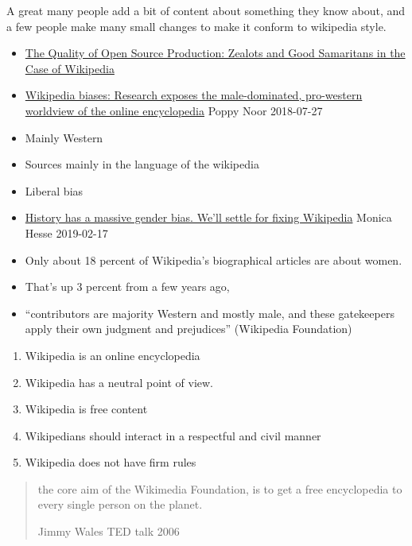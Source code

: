 \documentclass[a4paper,landscape,headrule,footrule,xetex]{foils}
\begin{document}
A great many people add a bit of content about something they know
about, and a few people make many small changes to make it conform to
wikipedia style.

\begin{itemize}
\item \href{https://www.cs.dartmouth.edu/~trdata/reports/abstracts/TR2007-606/}{The Quality of Open Source Production: Zealots and Good Samaritans in the Case of Wikipedia }
\end{itemize}



\begin{itemize}
\item  \href{https://www.theguardian.com/technology/2018/jul/29/the-five-wikipedia-biases-pro-western-male-dominated}{Wikipedia
    biases: 
Research exposes the male-dominated, pro-western worldview of the online encyclopedia}
  Poppy   Noor 2018-07-27
\item Mainly Western
\item Sources mainly in the language of the wikipedia
\item Liberal bias              %
\item  \href{https://www.washingtonpost.com/lifestyle/style/history-has-a-massive-gender-bias-well-settle-for-fixing-wikipedia/2019/02/15/b2537640-3163-11e9-86ab-5d02109aeb01_story.html?utm_term=.7d4409494928}{History
    has a massive gender bias. We'll settle for fixing Wikipedia}
  Monica Hesse 2019-02-17
\item Only about 18 percent of Wikipedia’s biographical articles are
  about women.
\item  That's up 3 percent from a few years ago,
\item ``contributors are majority Western and mostly male, and these
  gatekeepers apply their own judgment and prejudices'' (Wikipedia Foundation)
\end{itemize}

\begin{enumerate}
\item Wikipedia is an online encyclopedia
\item Wikipedia has a neutral point of view.
\item Wikipedia is free content
\item Wikipedians should interact in a respectful and civil manner
\item Wikipedia does not have firm rules
\end{enumerate}
\begin{quote}
  the core aim of the Wikimedia Foundation, is to get a free
  encyclopedia to every single person on the planet.
\begin{flushright}
  Jimmy Wales TED talk 2006
\end{flushright}
\end{quote}
\end{document}
